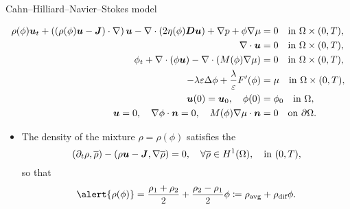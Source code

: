 \begin{frame}{Cahn--Hilliard--Navier--Stokes model}
  \footnotesize
  \begin{block}{}
  \vspace*{-0.3cm}
  \begin{subequations}
      \begin{align*}
          \rho(\phi)\bm{u}_t+\left((\rho(\phi)\bm{u} - {\bm{J}}
          )\cdot\nabla\right)\bm{u}-\nabla\cdot(2\eta(\phi)\bm{D}\bm{u})+\nabla p 
          + \phi \nabla \mu&=0\quad\text{in }\Omega\times(0,T),\\
          \nabla\cdot\bm{u}&=0\quad\text{in }\Omega\times(0,T),\\
          \phi_t+\nabla\cdot(\phi\bm{u})-\nabla\cdot(M(\phi)\nabla \mu)&=0\quad\text{in }\Omega\times(0,T),\\
          -\lambda\varepsilon\Delta\phi+\frac{\lambda}{\varepsilon}F'(\phi)&=\mu\quad\text{in }\Omega\times(0,T),\\
          \bm{u}(0)=\bm{u}_0,\quad\phi(0)&=\phi_0\quad\text{in }\Omega,\\
          \bm{u}=0,\quad\nabla\phi\cdot{\bm{n}}=0,\quad M(\phi)\nabla\mu\cdot{\bm{n}}&=0\quad\text{on }\partial\Omega.
      \end{align*}
  \end{subequations}
  \end{block}
  \begin{itemize}
      \item The density of the mixture \alert{$\rho=\rho(\phi)$} 
      satisfies the 
      \begin{equation*}
          \left(\partial_t\rho,\overline\rho\right)-\left(\rho\bm{u}-{\bm{J}},\nabla\overline\rho\right)=0,\quad\forall\overline\rho\in H^1(\Omega), 
      \quad  \hbox{in $(0,T)$},	
      \end{equation*}
      so that
          $$\alert{\rho(\phi)}=\frac{\rho_1+\rho_2}{2}+\frac{\rho_2-\rho_1}{2}\phi\coloneqq\rho_{\text{avg}}+\rho_{\text{dif}}\phi .$$
  \end{itemize}
\end{frame}

